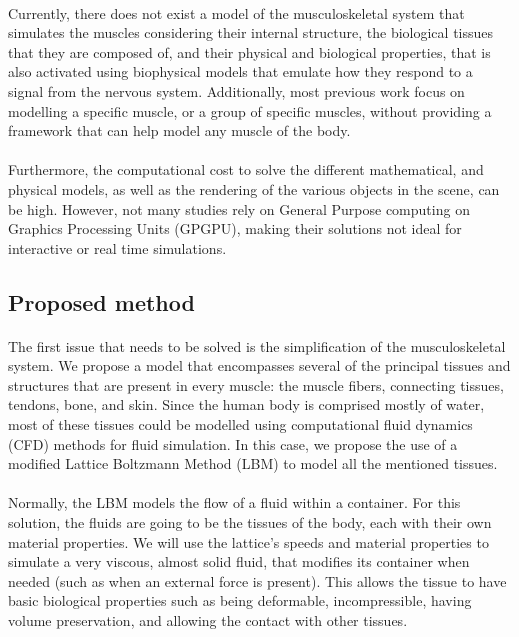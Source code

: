 \paragraph{}Currently, there does not exist a model of the musculoskeletal system that simulates the muscles considering their internal structure, the biological tissues that they are composed of, and their physical and biological properties, that is also activated using biophysical models that emulate how they respond to a signal from the nervous system. Additionally, most previous work focus on modelling a specific muscle, or a group of specific muscles, without providing a framework that can help model any muscle of the body.

\paragraph{}Furthermore, the computational cost to solve the different mathematical, and physical models, as well as the rendering of the various objects in the scene, can be high. However, not many studies rely on General Purpose computing on Graphics Processing Units (GPGPU), making their solutions not ideal for interactive or real time simulations.

\subsection{Proposed method}

\paragraph{}The first issue that needs to be solved is the simplification of the musculoskeletal system. We propose a model that encompasses several of the principal tissues and structures that are present in every muscle: the muscle fibers, connecting tissues, tendons, bone, and skin. Since the human body is comprised mostly of water, most of these tissues could be modelled using computational fluid dynamics (CFD) methods for fluid simulation. In this case, we propose the use of a modified Lattice Boltzmann Method (LBM) to model all the mentioned tissues. 

\paragraph{}Normally, the LBM models the flow of a fluid within a container. For this solution, the fluids are going to be the tissues of the body, each with their own material properties. We will use the lattice's speeds and material properties to simulate a very viscous, almost solid fluid, that modifies its container when needed (such as when an external force is present). This allows the tissue to have basic biological properties such as being deformable, incompressible, having volume preservation, and allowing the contact with other tissues.

